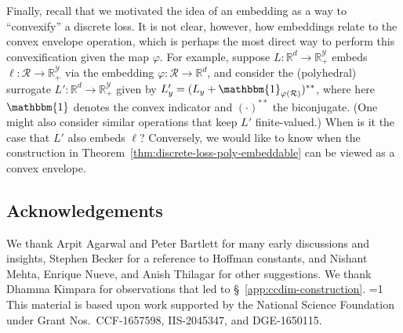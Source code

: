 \documentclass[twoside,11pt]{article}
\newcommand{\Comments}{1}
\newcommand{\mytodo}[2]{\ifnum\Comments=1%
  \todo[linecolor=#1!80!black,backgroundcolor=#1,bordercolor=#1!80!black]{#2}\fi}
\newcommand{\raft}[1]{\mytodo{green!20!white}{RF: #1}}
\newcommand{\reals}{\mathbb{R}}
\newcommand{\R}{\mathcal{R}}
\newcommand{\Y}{\mathcal{Y}}
\newcommand{\ones}{\mathbbm{1}}
\begin{document}
Finally, recall that we motivated the idea of an embedding as a way to ``convexify'' a discrete loss.
It is not clear, however, how embeddings relate to the convex envelope operation, which is perhaps the most direct way to perform this convexification given the map $\varphi$.
For example, suppose $L:\reals^d\to\reals^\Y_+$ embeds $\ell:\R\to\reals^\Y_+$ via the embedding $\varphi:\R\to\reals^d$, and consider the (polyhedral) surrogate $L':\reals^d\to\reals^\Y_+$ given by $L'_y = (L_y + \ones_{\varphi(\R)})^{**}$, where here $\ones$ denotes the convex indicator and $(\cdot)^{**}$ the biconjugate.
(One might also consider similar operations that keep $L'$ finite-valued.)
When is it the case that $L'$ also embeds $\ell$?
Conversely, we would like to know when the construction in Theorem~\ref{thm:discrete-loss-poly-embeddable} can be viewed as a convex envelope.


\subsection*{Acknowledgements}
We thank Arpit Agarwal and Peter Bartlett for many early discussions and insights,
Stephen Becker for a reference to Hoffman constants,
and Nishant Mehta, Enrique Nueve, and Anish Thilagar for other suggestions.
We thank Dhamma Kimpara for observations that led to \S~\ref{app:ccdim-construction}.
\raft{others?}
This material is based upon work supported by the National Science Foundation under Grant Nos.\ CCF-1657598, IIS-2045347, and DGE-1650115.





\appendix
\end{document}
